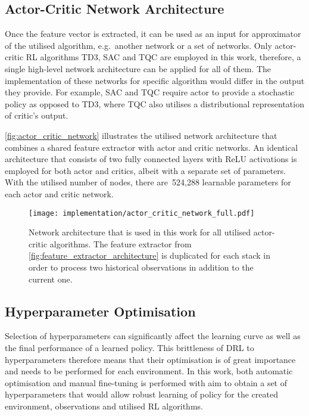 \subsection{Actor-Critic Network Architecture}\label{subsec:actor_critic_network_architecture}

Once the feature vector is extracted, it can be used as an input for approximator of the utilised algorithm, e.g.~another network or a set of networks. Only actor-critic RL algorithms TD3, SAC and TQC are employed in this work, therefore, a single high-level network architecture can be applied for all of them. The implementation of these networks for specific algorithm would differ in the output they provide. For example, SAC and TQC require actor to provide a stochastic policy as opposed to TD3, where TQC also utilises a distributional representation of critic's output.

\autoref{fig:actor_critic_network} illustrates the utilised network architecture that combines a shared feature extractor with actor and critic networks. An identical architecture that consists of two fully connected layers with ReLU activations is employed for both actor and critics, albeit with a separate set of parameters. With the utilised number of nodes, there are~524,288 learnable parameters for each actor and critic network.

\begin{figure}[ht]
    \centering
    \texttt{[image: implementation/actor\_critic\_network\_full.pdf]}
    \caption{Network architecture that is used in this work for all utilised actor-critic algorithms. The feature extractor from \protect\autoref{fig:feature_extractor_architecture} is duplicated for each stack in order to process two historical observations in addition to the current one.}
    \label{fig:actor_critic_network}
\end{figure}


\subsection{Hyperparameter Optimisation}

Selection of hyperparameters can significantly affect the learning curve as well as the final performance of a learned policy. This brittleness of DRL to hyperparameters therefore means that their optimisation is of great importance and needs to be performed for each environment. In this work, both automatic optimisation and manual fine-tuning is performed with aim to obtain a set of hyperparameters that would allow robust learning of policy for the created environment, observations and utilised RL algorithms.

